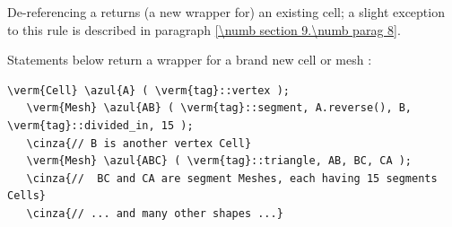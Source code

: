 De-referencing a {\small\tt{}} returns (a new wrapper for) an existing cell;
a slight exception to this rule is described in paragraph \ref{\numb section 9.\numb parag 8}.

Statements below return a wrapper for a brand new cell or mesh :

\begin{Verbatim}[commandchars=\\\{\},formatcom=\small\tt,
   baselinestretch=0.94,framesep=2mm                      ]
   \verm{Cell} \azul{A} ( \verm{tag}::vertex );
   \verm{Mesh} \azul{AB} ( \verm{tag}::segment, A.reverse(), B, \verm{tag}::divided_in, 15 );
   \cinza{// B is another vertex Cell}
   \verm{Mesh} \azul{ABC} ( \verm{tag}::triangle, AB, BC, CA );
   \cinza{//  BC and CA are segment Meshes, each having 15 segments Cells}
   \cinza{// ... and many other shapes ...}
\end{Verbatim}



